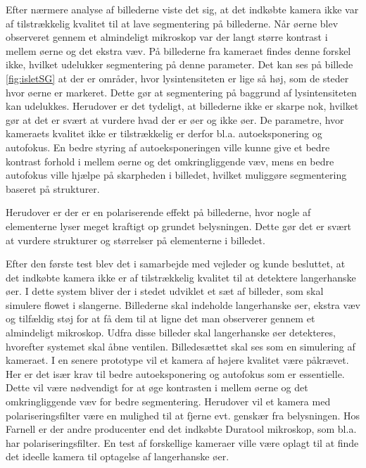 Efter nærmere analyse af billederne viste det sig, at det indkøbte kamera ikke var af tilstrækkelig kvalitet til at lave segmentering på billederne. Når øerne blev observeret gennem et almindeligt mikroskop var der langt større kontrast i mellem øerne og det ekstra væv. På billederne fra kameraet findes denne forskel ikke, hvilket udelukker segmentering på denne parameter. Det kan ses på billede \ref{fig:isletSG} at der er områder, hvor lysintensiteten er lige så høj, som de steder hvor øerne er markeret. Dette gør at segmentering på baggrund af lysintensiteten kan udelukkes. Herudover er det tydeligt, at billederne ikke er skarpe nok, hvilket gør at det er svært at vurdere hvad der er øer og ikke øer. De parametre, hvor kameraets kvalitet ikke er tilstrækkelig er derfor bl.a. autoeksponering og autofokus. En bedre styring af autoeksponeringen ville kunne give et bedre kontrast forhold i mellem øerne og det omkringliggende væv, mens en bedre autofokus ville hjælpe på skarpheden i billedet, hvilket muliggøre segmentering baseret på strukturer.

Herudover er der er en polariserende effekt på billederne, hvor nogle af elementerne lyser meget kraftigt op grundet belysningen. Dette gør det er svært at vurdere strukturer og størrelser på elementerne i billedet. 

Efter den første test blev det i samarbejde med vejleder og kunde besluttet, at det indkøbte kamera ikke er af tilstrækkelig kvalitet til at detektere langerhanske øer. I dette system bliver der i stedet udviklet et sæt af billeder, som skal simulere flowet i slangerne. Billederne skal indeholde langerhanske øer, ekstra væv og tilfældig støj for at få dem til at ligne det man observerer gennem et almindeligt mikroskop. Udfra disse billeder skal langerhanske øer detekteres, hvorefter systemet skal åbne ventilen. Billedesættet skal ses som en simulering af kameraet. I en senere prototype vil et kamera af højere kvalitet være påkrævet. Her er det især krav til bedre autoeksponering og autofokus som er essentielle. Dette vil være nødvendigt for at øge kontrasten i mellem øerne og det omkringliggende væv for bedre segmentering. Herudover vil et kamera med polariseringsfilter være en mulighed til at fjerne evt. genskær fra belysningen. Hos Farnell er der andre producenter end det indkøbte Duratool mikroskop, som bl.a. har polariseringsfilter. En test af forskellige kameraer ville være oplagt til at finde det ideelle kamera til optagelse af langerhanske øer. 